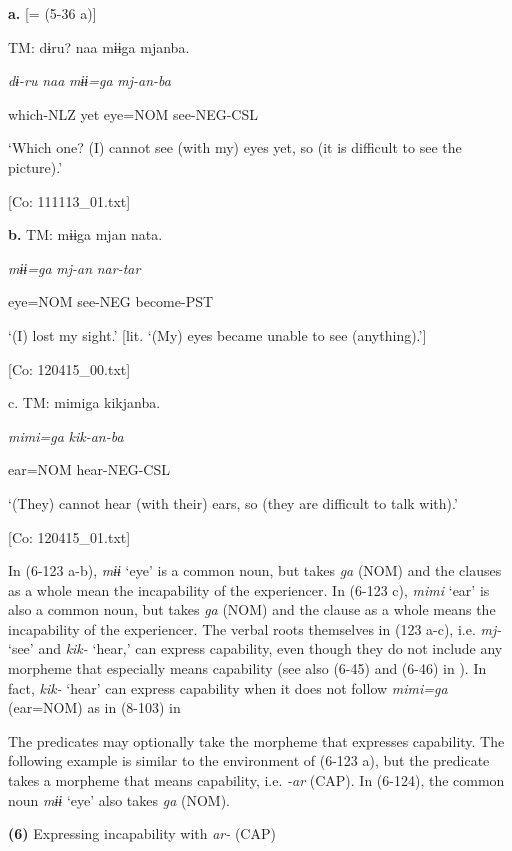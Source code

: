   \textbf{a.}  [= (5-36 a)]

    TM:  dɨru?  naa  mɨɨga  mjanba.

      \textit{dɨ-ru}  \textit{naa}  \textit{mɨɨ=ga}  \textit{mj-an{}-ba}

      which-NLZ  yet  eye=NOM  see-NEG-CSL

      ‘Which one? (I) cannot see (with my) eyes yet, so (it is difficult to see the picture).’

      [Co: 111113\_01.txt]

  \textbf{b.}  TM:  mɨɨga  mjan  nata.

      \textit{mɨɨ=ga}  \textit{mj-an}  \textit{nar-tar}

      eye=NOM  see-NEG  become-PST

      ‘(I) lost my sight.’ [lit. ‘(My) eyes became unable to see (anything).’]

      [Co: 120415\_00.txt]

  c.  TM:  mimiga  kikjanba.

      \textit{mimi=ga}  \textit{kik-an{}-ba}

      ear=NOM  hear-NEG-CSL

      ‘(They) cannot hear (with their) ears, so (they are difficult to talk with).’

      [Co: 120415\_01.txt]

In (6-123 a-b), \textit{mɨɨ} ‘eye’ is a common noun, but takes \textit{ga} (NOM) and the clauses as a whole mean the incapability of the experiencer. In (6-123 c), \textit{mimi} ‘ear’ is also a common noun, but takes \textit{ga} (NOM) and the clause as a whole means the incapability of the experiencer. The verbal roots themselves in (123 a-c), i.e. \textit{mj-} ‘see’ and \textit{kik-} ‘hear,’ can express capability, even though they do not include any morpheme that especially means capability (see also (6-45) and (6-46) in ). In fact, \textit{kik-} ‘hear’ can express capability when it does not follow \textit{mimi=ga} (ear=NOM) as in (8-103) in 

The predicates may optionally take the morpheme that expresses capability. The following example is similar to the environment of (6-123 a), but the predicate takes a morpheme that means capability, i.e. \textit{{}-ar} (CAP). In (6-124), the common noun \textit{mɨɨ} ‘eye’ also takes \textit{ga} (NOM).

\textbf{(6)}  Expressing incapability with \textit{ar-} (CAP)

